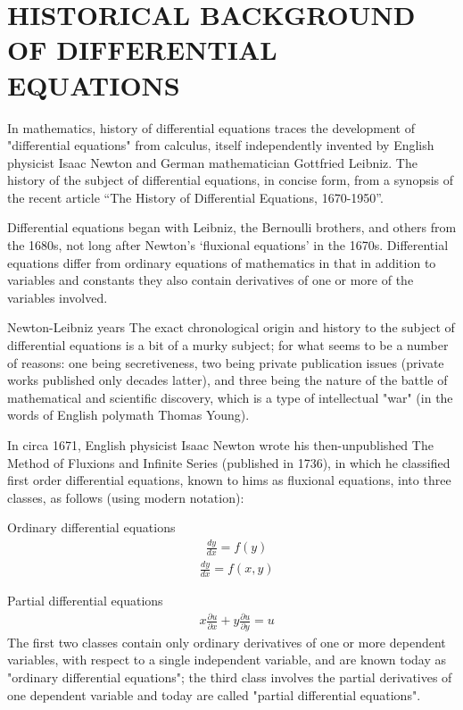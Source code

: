 \documentclass[12pt]{report}
\begin{document}
\section{HISTORICAL BACKGROUND OF DIFFERENTIAL EQUATIONS}
\qquad In mathematics, history of differential equations traces the development of "differential equations" from calculus, itself independently invented by English physicist Isaac Newton and German mathematician Gottfried Leibniz. The history of the subject of differential equations, in concise form, from a synopsis of the recent article “The History of Differential Equations, 1670-1950”. \par Differential equations began with Leibniz, the Bernoulli brothers, and others from the 1680s, not long after Newton’s ‘fluxional equations’ in the 1670s. Differential equations differ from ordinary equations of mathematics in that in addition to variables and constants they also contain derivatives of one or more of the variables involved. 
\par Newton-Leibniz years
The exact chronological origin and history to the subject of differential equations is a bit of a murky subject; for what seems to be a number of reasons: one being secretiveness, two being private publication issues (private works published only decades latter), and three being the nature of the battle of mathematical and scientific discovery, which is a type of intellectual "war" (in the words of English polymath Thomas Young).
\par In circa 1671, English physicist Isaac Newton wrote his then-unpublished The Method of Fluxions and Infinite Series (published in 1736), in which he classified first order differential equations, known to hims as fluxional equations, into three classes, as follows (using modern notation):
\par Ordinary differential equations
\begin{align*}
&\frac{dy}{dx}=f(y)\tag{Class 1}
\end{align*}
\begin{align*}
&\frac{dy}{dx}=f(x,y)\tag{Class 2}
\end{align*}
\par Partial differential equations
\begin{align*}
& x \frac{\partial u}{\partial x}+ y\frac{\partial u}{\partial y}=u\tag{Class 3}
\end{align*}
The first two classes contain only ordinary derivatives of one or more dependent variables, with respect to a single independent variable, and are known today as "ordinary differential equations"; the third class involves the partial derivatives of one dependent variable and today are called "partial differential equations".
\end{document}

